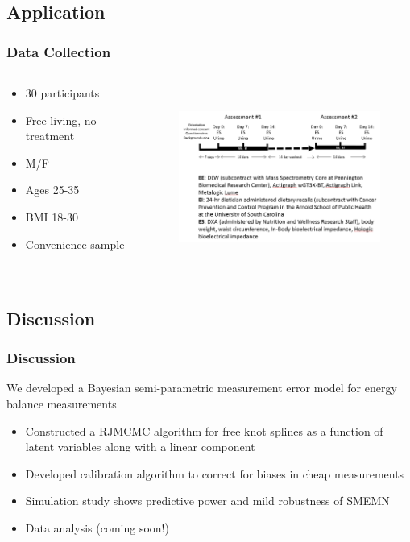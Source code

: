 \documentclass[handout]{beamer}\usepackage[]{graphicx}\usepackage[]{color}
\begin{document}
\subsection{Application}

\begin{frame}
\frametitle{Data Collection}
\begin{columns}
\begin{column}{0.3\textwidth}
  \begin{itemize}
  \item
  30 participants
  \item
  Free living, no treatment
  \item
  M/F
  \item
  Ages 25-35
  \item
  BMI 18-30
  \item
  Convenience sample
\end{itemize}
\end{column}
\begin{column}{0.7\textwidth}
\begin{figure}
\centering
\includegraphics[height=6cm,width=8cm]{studydesign}
\end{figure}
\end{column}
\end{columns}

\end{frame}


\subsection{Discussion}

\begin{frame}
\frametitle{Discussion}
We developed a Bayesian semi-parametric measurement error model for energy balance measurements

\begin{itemize}
\item
Constructed a RJMCMC algorithm for free knot splines as a function of latent variables along with a linear component
\item
Developed calibration algorithm to correct for biases in cheap measurements
\item
Simulation study shows predictive power and mild robustness of SMEMN
\item
Data analysis (coming soon!)
\end{itemize}

\end{frame}
\end{document}
